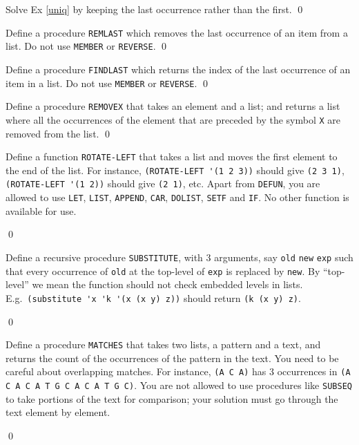 \documentclass[a4paper,11pt]{article}
\begin{document}
\begin{uexercise}
Solve Ex \ref{uniq} by keeping the last occurrence rather than the first.
\qed
\end{uexercise}

\begin{uexercise}
Define a procedure \Verb+REMLAST+ which removes the last occurrence of an item from a list. Do not use \Verb+MEMBER+ or \Verb+REVERSE+.
\qed
\end{uexercise}

\begin{uexercise}[*]
Define a procedure \Verb+FINDLAST+ which returns the index of the last occurrence of an item in a list. Do not use \Verb+MEMBER+ or \Verb+REVERSE+.
\qed
\end{uexercise}

\begin{uexercise}

Define a procedure \Verb+REMOVEX+  that takes an element and a list; and returns a list where all the occurrences of the element that are preceded by the symbol \Verb+X+ are removed from the list.
\qed
\end{uexercise}

\begin{uexercise}
Define a function \Verb+ROTATE-LEFT+ that takes a list and moves the first element to the end of the list. For instance, \Verb+(ROTATE-LEFT '(1 2 3))+ should give \Verb+(2 3 1)+, \Verb+(ROTATE-LEFT '(1 2))+ should give \Verb+(2 1)+, etc. Apart from \Verb+DEFUN+, you are allowed to use \Verb+LET+, \Verb+LIST+, \Verb+APPEND+, \Verb+CAR+, \Verb+DOLIST+, \Verb+SETF+ and \Verb+IF+. No other function is available for use.

\qed
\end{uexercise}


\begin{uexercise}

Define a recursive  procedure \Verb+SUBSTITUTE+, with 3 arguments, say \Verb+old+ \Verb+new+ \Verb+exp+ such that every occurrence of \Verb+old+ at the top-level of \Verb+exp+ is replaced by \Verb+new+. By ``top-level'' we mean the function should not check embedded levels in lists. E.g.\ \Verb+(substitute 'x 'k '(x (x y) z))+ should return \Verb+(k (x y) z)+.

\qed
\end{uexercise}

\begin{uexercise}

Define a procedure \Verb+MATCHES+ that takes two lists, a pattern and a text, and returns the count of the occurrences of the pattern in the text. You need to be careful about overlapping matches. For instance, \Verb+(A C A)+ has 3 occurrences in \Verb+(A C A C A T G C A C A T G C)+. You are not allowed to use procedures like \Verb+SUBSEQ+ to take portions of the text for comparison; your solution must go through the text element by element.

\qed
\end{uexercise}
\end{document}
